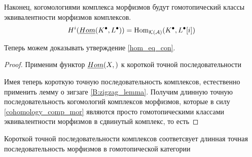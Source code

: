 \documentclass[../main.tex]{subfiles}
\begin{document}
\begin{to_com}\label{cohomology_comp_mor}
Наконец, когомологиями комплекса морфизмов будут гомотопический классы эквивалентности морфизмов комплексов.
\[
H^i (\underline{Hom}(K^\bullet, L^\bullet)) = \operatorname{Hom}_{\mathcal{K(A)}}(K^\bullet, L^\bullet[i])
\]
\end{to_com}
Теперь можем доказывать утверждение \ref{hom_eq_con}.
\begin{proof}
Применим функтор $\underline{Hom}(X,)$ к короткой точной последовательности
\bee\label{3:cone_short_exact_eq}
\eee
\bee
\eee
Имея теперь короткую точную последовательность комплексов, естественно применить лемму о зигзаге \ref{B:zigzag_lemma}. Получим длинную точную последовательность когомологий комплексов морфизмов, которые в силу \ref{cohomology_comp_mor} являются просто гомотопическими классами эквивалентности морфизмов в сдвинутый комплекс, то есть
\bee
{}
\eee
\end{proof}
\begin{to_lem}
    Короткой точной последовательности комплексов соответсвует длинная точная последовательность морфизмов в гомотопической категории
    \bee
{}
    \eee
\bee
{}
    \eee
\end{to_lem}
\end{document}
